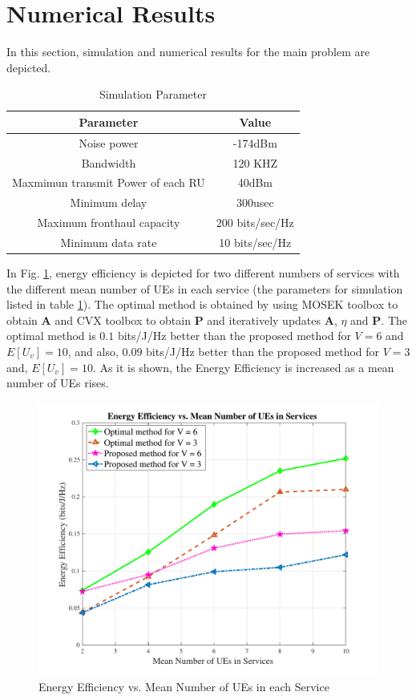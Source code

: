 \documentclass[conference]{IEEEtran}
\begin{document}
\section{Numerical Results}\label{simul}
In this section, simulation and numerical results for the main problem are depicted.
 \begin{table}
 \caption {Simulation Parameter} \label{table:1a}
 \begin{center}
  \begin{tabular}{||c c ||}
  \hline
Parameter & Value \\ [0.5ex]
  \hline\hline
  Noise power & -174dBm\\
  \hline
  Bandwidth & 120 KHZ \\
  \hline
 Maxmimun transmit Power of each RU & 40dBm \\
  \hline
  Minimum delay &  300usec \\
  \hline
  Maximum fronthaul capacity  & 200 bits/sec/Hz \\
   \hline
  Minimum data rate &  10 bits/sec/Hz \\ [1ex]
  \hline
 \end{tabular}
 \end{center}
 \end{table}
In Fig. \ref{fig:f1a}, energy efficiency is depicted for two different numbers of services with the different mean number of UEs in each service (the parameters for simulation listed in table \ref{table:1a}). The optimal method is obtained by using MOSEK toolbox to obtain $\boldsymbol{A}$ and CVX toolbox to obtain $\boldsymbol{P}$ and iteratively updates $\boldsymbol{A}$, $\eta$ and $\boldsymbol{P}$. The optimal method is $0.1$ bits/J/Hz better than the proposed method for $V = 6$ and $E[U_v] = 10$, and also, $0.09$ bits/J/Hz better than the proposed method for $V = 3$ and, $E[U_v] = 10$. As it is shown, the Energy Efficiency is increased as a mean number of UEs rises.
\begin{figure}%
  \centering
    \includegraphics[width=\linewidth]{fig1_last}
  \caption{Energy Efficiency vs. Mean Number of UEs in each Service}
  \label{fig:f1a}
\end{figure}
\end{document}
